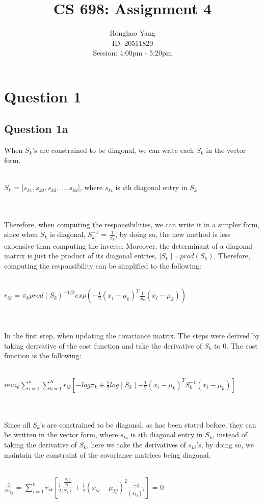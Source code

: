 \documentclass[11pt]{article} %
\title{CS 698: Assignment 4}
\author{Ronghao Yang\\ID: 20511820\\Session: 4:00pm - 5:20pm}
\begin{document}
\maketitle

\section{Question 1}
\subsection{Question 1a}
When $S_{k}$'s are constrained to be diagonal, we can write each $S_{k}$ in the vector form. \\\\
\centerline{$S_{k}$ = [$s_{k1},s_{k2},s_{k3},...,s_{kd}$], where $s_{ki}$ is $i$th diagonal entry in $S_{k}$}\\\\
Therefore, when computing the responsibilities, we can write it in a simpler form, since when $S_{k}$ is diagonal, $S_{k}^{-1}$ = $\frac{1}{S_{k}}$, by doing so, the new method is less expensive than computing the inverse. Moreover, the determinant of a diagonal matrix is just the product of its diagonal entries, $\mid S_{k}\mid$=$prod(S_{k})$. Therefore, computing the responsibility can be simplified to the following:\\\\
\centerline{$r_{ik}$ = $\pi_{k}prod(S_{k})^{-1/2}exp(-\frac{1}{2}(x_i-\mu_k)^{T}\frac{1}{S_k}(x_i-\mu_k))$}\\\\
In the first step, when updating the covariance matrix. The steps were derived by taking derivative of the cost function and take the derivative of $S_{k}$ to 0. The cost function is the following:\\\\
\centerline{$min_{\theta}\sum_{i=1}^{n}\sum_{k=1}^{K}r_{ik}[-log\pi_{k}+\frac{1}{2}log\mid S_{k}\mid+\frac{1}{2}(x_i-\mu_k)^{T}S_{k}^{-1}(x_i-\mu_k)]$}\\\\
Since all $S_{k}$'s are constrained to be diagonal, as has been stated before, they can be written in the vector form, where $s_{ki}$ is $i$th diagonal entry in $S_{k}$, instead of taking the derivative of $S_{k}$, here we take the derivatives of $s_{ki}$'s, by doing so, we maintain the constraint of the covariance matrices being diagonal.\\\\
\centerline{$\frac{\partial}{\partial s_{kj}}$ = $\sum_{i=1}^{n}r_{ik}[\frac{1}{2}\frac{\frac{\mid S_{k}\mid}{s_{kj}}}{\mid S_{k}\mid}+\frac{1}{2}(x_{ij}-\mu_{kj})^{2}\frac{-1}{(s_{kj})^2}]$ = $0$}\\\\ 
\end{document}

